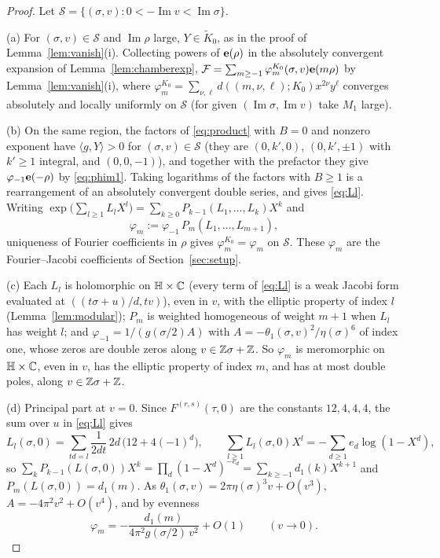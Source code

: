 \begin{proof}
Let $\mathcal S=\{(\sigma,v):0<-\operatorname{Im}v<\operatorname{Im}\sigma\}$.

(a) For $(\sigma,v)\in\mathcal S$ and $\operatorname{Im}\rho$ large, $Y\in\tilde K_0$, as in the proof of Lemma~\ref{lem:vanish}(i). Collecting powers of $\mathbf e(\rho)$ in the absolutely convergent expansion of Lemma~\ref{lem:chamberexp}, $\mathcal F=\sum_{m\ge-1}\varphi^{K_0}_m(\sigma,v)\mathbf e(m\rho)$ by Lemma~\ref{lem:vanish}(i), where $\varphi^{K_0}_m=\sum_{\nu,\ell}d((m,\nu,\ell);K_0)x^{2\nu}y^\ell$ converges absolutely and locally uniformly on $\mathcal S$ (for given $(\operatorname{Im}\sigma,\operatorname{Im}v)$ take $M_1$ large).

(b) On the same region, the factors of \eqref{eq:product} with $B=0$ and nonzero exponent have $\langle g,Y\rangle>0$ for $(\sigma,v)\in\mathcal S$ (they are $(0,k',0)$, $(0,k',\pm1)$ with $k'\ge1$ integral, and $(0,0,-1)$), and together with the prefactor they give $\varphi_{-1}\mathbf e(-\rho)$ by \eqref{eq:phim1}. Taking logarithms of the factors with $B\ge1$ is a rearrangement of an absolutely convergent double series, and gives \eqref{eq:Ll}. Writing $\exp\big(\sum_{l\ge1}L_lX^l\big)=\sum_{k\ge0}P_{k-1}(L_1,\dots,L_k)X^k$ and
\[
\varphi_m:=\varphi_{-1}\,P_m(L_1,\dots,L_{m+1}),
\]
uniqueness of Fourier coefficients in $\rho$ gives $\varphi^{K_0}_m=\varphi_m$ on $\mathcal S$. These $\varphi_m$ are the Fourier--Jacobi coefficients of Section~\ref{sec:setup}.

(c) Each $L_l$ is holomorphic on $\mathbb H\times\mathbb{C}$ (every term of \eqref{eq:Ll} is a weak Jacobi form evaluated at $((t\sigma+u)/d,tv)$), even in $v$, with the elliptic property of index $l$ (Lemma~\ref{lem:modular}); $P_m$ is weighted homogeneous of weight $m+1$ when $L_l$ has weight $l$; and $\varphi_{-1}=1/(g(\sigma/2)A)$ with $A=-\theta_1(\sigma,v)^2/\eta(\sigma)^6$ of index one, whose zeros are double zeros along $v\in\mathbb{Z}\sigma+\mathbb{Z}$. So $\varphi_m$ is meromorphic on $\mathbb H\times\mathbb{C}$, even in $v$, has the elliptic property of index $m$, and has at most double poles, along $v\in\mathbb{Z}\sigma+\mathbb{Z}$.

(d) Principal part at $v=0$. Since $F^{(r,s)}(\tau,0)$ are the constants $12,4,4,4$, the sum over $u$ in \eqref{eq:Ll} gives
\[
L_l(\sigma,0)=\sum_{td=l}\frac1{2dt}\,2d\,\big(12+4(-1)^d\big),\qquad \sum_{l\ge1}L_l(\sigma,0)X^l=-\sum_{d\ge1}e_d\log(1-X^d),
\]
so $\sum_kP_{k-1}(L(\sigma,0))X^k=\prod_d(1-X^d)^{-e_d}=\sum_{k\ge-1}d_1(k)X^{k+1}$ and $P_m(L(\sigma,0))=d_1(m)$. As $\theta_1(\sigma,v)=2\pi\eta(\sigma)^3v+O(v^3)$, $A=-4\pi^2v^2+O(v^4)$, and by evenness
\[
\varphi_m=-\frac{d_1(m)}{4\pi^2g(\sigma/2)\,v^2}+O(1)\qquad(v\to0).
\]


\end{proof}
